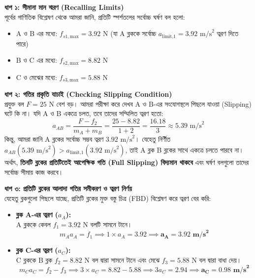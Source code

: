 \documentclass[12pt, a4paper]{article}
\begin{document}
\begin{tcolorbox}[solutionbox={সমাধান (Solution) }]
\noindent
\textbf{ধাপ ১: সীমানা মান স্মরণ (Recalling Limits)} \\
পূর্বের গাণিতিক বিশ্লেষণ থেকে আমরা জানি, প্রতিটি স্পর্শতলের সর্বোচ্চ ঘর্ষণ বল হলো:
\begin{itemize}[leftmargin=*, parsep=0.5ex]
    \item A ও B এর মধ্যে: $f_{s1,\text{max}} = 3.92\text{ N}$ (যা A ব্লককে সর্বোচ্চ $a_{\text{limit,1}} = 3.92\text{ m/s}^2$ ত্বরণ দিতে পারে)
    \item B ও C এর মধ্যে: $f_{s2,\text{max}} = 8.82\text{ N}$
    \item C ও মেঝের মধ্যে: $f_{s3,\text{max}} = 5.88\text{ N}$
\end{itemize}

\vspace{0.5em}
\noindent
\textbf{ধাপ ২: গতির প্রকৃতি যাচাই (Checking Slipping Condition)} \\
প্রযুক্ত বল $F = 25\text{ N}$ বেশ বড়। আমরা পরীক্ষা করে দেখব A ও B-এর সংযোগস্থলে পিছলে যাওয়া (Slipping) ঘটে কি না। যদি A ও B একত্রে চলত, তবে তাদের সম্মিলিত ত্বরণ হতো:
\[ a_{AB} = \frac{F - f_2}{m_A + m_B} = \frac{25 - 8.82}{1 + 2} = \frac{16.18}{3} \approx 5.39\text{ m/s}^2 \]
কিন্তু, আমরা জানি A ব্লকের সর্বোচ্চ সম্ভব ত্বরণ $3.92\text{ m/s}^2$। যেহেতু নির্ণীত $a_{AB} (5.39\text{ m/s}^2) > a_{\text{limit,1}} (3.92\text{ m/s}^2)$, তাই A ব্লক B ব্লকের সাথে একত্রে চলতে পারবে না। \\
অর্থাৎ, \textbf{তিনটি ব্লকের প্রতিটিতেই আপেক্ষিক গতি (Full Slipping) বিদ্যমান থাকবে} এবং ঘর্ষণ বলগুলো তাদের সর্বোচ্চ সীমায় কাজ করবে।

\vspace{0.5em}
\noindent
\textbf{ধাপ ৩: প্রতিটি ব্লকের আলাদা গতির সমীকরণ ও ত্বরণ নির্ণয়} \\
যেহেতু ব্লকগুলো পিছলে যাচ্ছে, প্রতিটি ব্লকের মুক্ত বস্তু চিত্র (FBD) বিশ্লেষণ করে ত্বরণ বের করি:

\begin{itemize}[leftmargin=*, parsep=0.5ex]
    \item \textbf{ব্লক A-এর ত্বরণ ($a_A$):} \\
    A ব্লককে কেবল $f_1 = 3.92\text{ N}$ বলটি সামনে টানে। 
    \[ m_A a_A = f_1 \implies 1 \times a_A = 3.92 \implies \mathbf{a_A = 3.92\text{ m/s}^2} \]
    
    \item \textbf{ব্লক C-এর ত্বরণ ($a_C$):} \\
    C ব্লককে B ব্লক $f_2 = 8.82\text{ N}$ বল দ্বারা সামনে টানে এবং মেঝে $f_3 = 5.88\text{ N}$ বল দ্বারা বাধা দেয়।
    \[ m_C a_C = f_2 - f_3 \implies 3 \times a_C = 8.82 - 5.88 \implies 3a_C = 2.94 \implies \mathbf{a_C = 0.98\text{ m/s}^2} \]
    

\end{itemize}
\end{tcolorbox}
\end{document}
